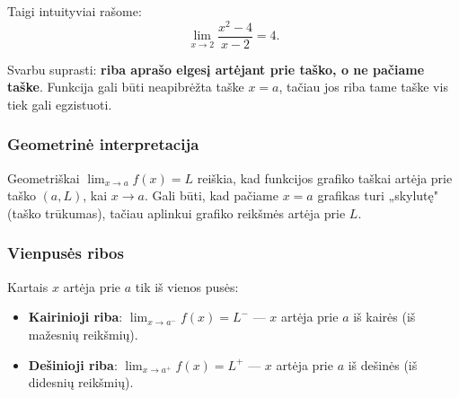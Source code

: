 Taigi intuityviai rašome:
\[
    \lim_{x \to 2} \frac{x^2 - 4}{x - 2} = 4.
\]

\begin{remark}
Svarbu suprasti: \textbf{riba aprašo elgesį artėjant prie taško, o ne pačiame taške}. Funkcija gali būti neapibrėžta taške $x = a$, tačiau jos riba tame taške vis tiek gali egzistuoti.
\end{remark}

\subsubsection*{Geometrinė interpretacija}

Geometriškai $\lim_{x \to a} f(x) = L$ reiškia, kad funkcijos grafiko taškai artėja prie taško $(a, L)$, kai $x \to a$. Gali būti, kad pačiame $x = a$ grafikas turi „skylutę" (taško trūkumas), tačiau aplinkui grafiko reikšmės artėja prie $L$.

\begin{center}
\end{center}

\subsubsection*{Vienpusės ribos}

Kartais $x$ artėja prie $a$ tik iš vienos pusės:

\begin{itemize}
    \item \textbf{Kairinioji riba}: $\displaystyle\lim_{x \to a^-} f(x) = L^-$ — $x$ artėja prie $a$ iš kairės (iš mažesnių reikšmių).
    \item \textbf{Dešinioji riba}: $\displaystyle\lim_{x \to a^+} f(x) = L^+$ — $x$ artėja prie $a$ iš dešinės (iš didesnių reikšmių).
\end{itemize}

